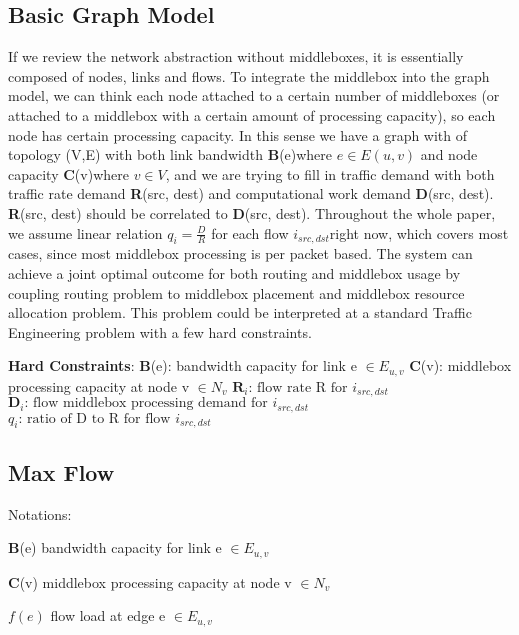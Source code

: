 \documentclass{sig-alternate}
\begin{document}
\subsection{Basic Graph Model}
If we review the network abstraction without middleboxes, it is essentially composed of nodes, links and flows. To integrate the middlebox into the graph model, we can think each node attached to a certain number of middleboxes (or attached to a middlebox with a certain amount of processing capacity), so each node has certain processing capacity. In this sense we have a graph with of topology (V,E) with both link bandwidth \textbf{B}(e)where $e \in E(u,v)$ and node capacity \textbf{C}(v)where $v \in V $, and we are trying to fill in traffic demand with both traffic rate demand \textbf{R}(src, dest) and computational work demand \textbf{D}(src, dest). \textbf{R}(src, dest) should be correlated to \textbf{D}(src, dest). Throughout the whole paper, we assume linear relation $q_i = \frac{D}{R}$ for each flow $ i_{src,dst} $right now, which covers most cases, since most middlebox processing is per packet based. The system can achieve a joint optimal outcome for both routing and middlebox usage by coupling routing problem to middlebox placement and middlebox resource allocation problem. This problem could be interpreted at a standard Traffic Engineering problem with a few hard constraints.

\textbf{Hard Constraints}:
\newline
\textbf{B}(e): bandwidth capacity for link e $\in E_{u,v}$
 \newline
\textbf{C}(v): middlebox processing capacity at node v $\in N_{v}$
 \newline
$ \boldsymbol{R}_{i} \text{: flow rate R for } i_{src, dst}$ 
\newline
$ \boldsymbol{D}_{i} \text{: flow middlebox processing demand for } i_{src, dst}$
\newline 
$ q_{i} \text{: ratio of D to R for flow } i_{src, dst}$ 
\subsection{Max Flow }

Notations:

\textbf{B}(e) bandwidth capacity for link e $\in E_{u,v}$ 

\textbf{C}(v) middlebox processing capacity at node v $\in N_{v}$ 

$ f(e) $  flow load at edge e $\in E_{u,v} $ 
\end{document}
